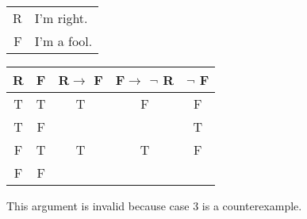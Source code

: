 \begin{tabular}{r l}
    R & I'm right. \\
    F & I'm a fool.
\end{tabular}

\begin{tabular}{c|c||c|c||c}
    R & F & R$\rightarrow$ F & F$\rightarrow$ $\lnot$ R & $\lnot$ F \\
    \hline
    T & T & T & F & F \\
    T & F &   &   & T \\
    F & T & T & T & F \\
    F & F &   &   &  
\end{tabular}

\noindent This argument is invalid because case 3 is a counterexample.